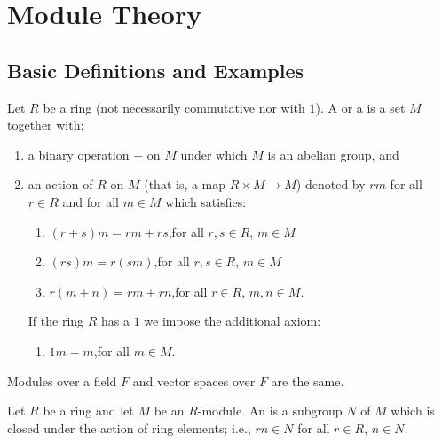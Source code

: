 \chapter{Module Theory}\label{chapter:module-theory}


\section{Basic Definitions and Examples}\label{sec:basic-defs-examples}
    \begin{definition}\label{def:module-axioms}
        Let $R$ be a ring (not necessarily commutative nor with $1$). A  or a  is a set $M$ together with:
        \begin{enumerate}[label = (\arabic*)]
            \item a binary operation $+$ on $M$ under which $M$ is an abelian group, and
            \item an action of $R$ on $M$ (that is, a map $R \times M \rightarrow M$) denoted by $rm$ for all $r \in R$ and for all $m \in M$ which satisfies:
            \begin{enumerate}[label = (\alph*)]
                \item $(r+s)m = rm + rs$,\quad for all $r,s \in R$, $m \in M$
                \item $(rs)m = r(sm)$,\quad for all $r,s \in R$, $m \in M$
                \item $r(m+n) = rm + rn$,\quad for all $r \in R$, $m,n \in M$.
            \end{enumerate}
            If the ring $R$ has a $1$ we impose the additional axiom:
            \begin{enumerate}[label = (\alph*)]
                \addtocounter{enumii}{3}
                \item $1m = m$,\quad for all $m \in M$.
            \end{enumerate}
        \end{enumerate}
    \end{definition}

    \begin{note}
        Modules over a field $F$ and vector spaces over $F$ are the same.
    \end{note}

    \begin{definition}\label{def:submodule}
        Let $R$ be a ring and let $M$ be an $R$-module. An  is a subgroup $N$ of $M$ which is closed under the action of ring elements; i.e., $rn \in N$ for all $r \in R$, $n \in N$.
    \end{definition}

